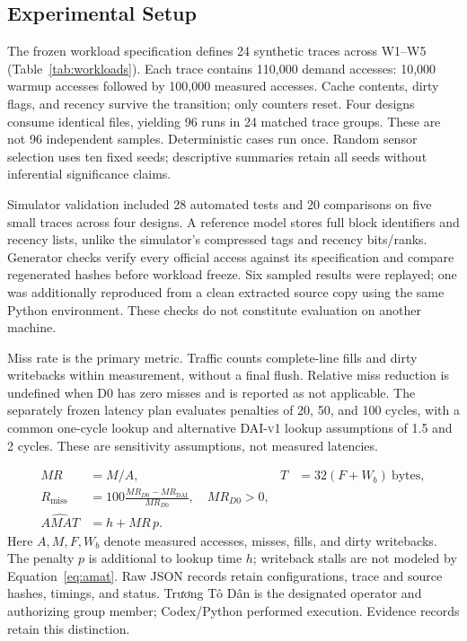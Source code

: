 \documentclass[11pt,a4paper]{article}
\newcommand{\dai}{\textsc{DAI-v1}}
\begin{document}
\subsection{Experimental Setup}
The frozen workload specification defines 24 synthetic traces across W1--W5 (Table~\ref{tab:workloads}). Each trace contains 110,000 demand accesses: 10,000 warmup accesses followed by 100,000 measured accesses. Cache contents, dirty flags, and recency survive the transition; only counters reset. Four designs consume identical files, yielding 96 runs in 24 matched trace groups. These are not 96 independent samples. Deterministic cases run once. Random sensor selection uses ten fixed seeds; descriptive summaries retain all seeds without inferential significance claims.

Simulator validation included 28 automated tests and 20 comparisons on five small traces across four designs. A reference model stores full block identifiers and recency lists, unlike the simulator's compressed tags and recency bits/ranks. Generator checks verify every official access against its specification and compare regenerated hashes before workload freeze. Six sampled results were replayed; one was additionally reproduced from a clean extracted source copy using the same Python environment. These checks do not constitute evaluation on another machine.

Miss rate is the primary metric. Traffic counts complete-line fills and dirty writebacks within measurement, without a final flush. Relative miss reduction is undefined when D0 has zero misses and is reported as not applicable. The separately frozen latency plan evaluates penalties of 20, 50, and 100 cycles, with a common one-cycle lookup and alternative \dai{} lookup assumptions of 1.5 and 2 cycles. These are sensitivity assumptions, not measured latencies.

\begin{align}
MR &= M/A, & T &= 32(F+W_b)\ \text{bytes},\label{eq:metrics}\\
R_{\mathrm{miss}} &= 100\frac{MR_{D0}-MR_{\mathrm{DAI}}}{MR_{D0}},\quad MR_{D0}>0,\label{eq:reduction}\\
\widehat{AMAT} &= h + MR\,p.\label{eq:amat}
\end{align}
Here $A,M,F,W_b$ denote measured accesses, misses, fills, and dirty writebacks. The penalty $p$ is additional to lookup time $h$; writeback stalls are not modeled by Equation~\ref{eq:amat}. Raw JSON records retain configurations, trace and source hashes, timings, and status. Trương Tô Dân is the designated operator and authorizing group member; Codex/Python performed execution. Evidence records retain this distinction.
\end{document}
